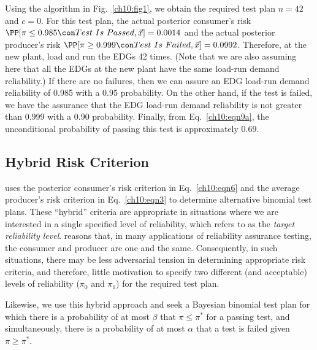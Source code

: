 \documentclass {book}
\begin{document}
\begin{sidebar}
Using the algorithm in Fig.~\ref{ch10:fig1}, we obtain the
required test plan $n = 42$ and $c = 0$. For this test plan, the
actual posterior consumer's risk \linebreak $\PP[\pi \leq 0.985
\con Test\mbox{ }Is\mbox{ }Passed, \vec{x}] = 0.0014$ and the
actual posterior producer's risk $\PP[\pi \geq 0.999\con
Test\mbox{ }Is\mbox{ }Failed,\vec{x}] = 0.0992$. Therefore, at the
new plant, load and run the EDGs 42 times. (Note that we are also
assuming here that all the EDGs at the new plant have the same
load-run demand reliability.) If there are no failures, then we
can assure an EDG load-run demand reliability of 0.985 with a 0.95
probability. On the other hand, if the test is failed, we have the
assurance that the EDG load-run demand reliability is not greater
than 0.999 with a 0.90 probability. Finally, from
Eq.~\ref{ch10:eqn9a}, the unconditional probability of passing
this test is approximately 0.69.
\end{sidebar}

\subsection{Hybrid Risk Criterion}\label{ch10:sec1:ss4}
\citet{FMP99} uses the posterior consumer's
risk criterion in
Eq.~\ref{ch10:eqn6} and the average producer's risk criterion in
Eq.~\ref{ch10:eqn3} to 
determine alternative binomial test plans. These ``hybrid''
criteria are appropriate in situations where we are interested in
a single specified level of reliability, which \citet{FMP99}
refers to as the \emph{target reliability
level}. \citet{FMP99} reasons that,
in many applications of reliability assurance testing, the
consumer and producer are one and the same. Consequently, in such
situations, there may be less adversarial tension in determining
appropriate risk criteria, and therefore, little motivation to
specify two different (and acceptable) levels of reliability
($\pi_{0}$ and $\pi_{1}$) for the required test
plan. 
 

Likewise, we use this hybrid approach and seek a Bayesian binomial
test plan for which there is a probability of at most $\beta$ that
$\pi \leq \pi^{*}$ for a passing test, and simultaneously, there
is a probability of at most $\alpha$ that a test is failed given
$\pi \geq \pi^{*}$.
\end{document}
